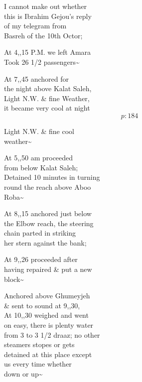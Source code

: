 \documentclass{report}
\begin{document}
	\par{
 	I cannot make out whether\ \\this is Ibrahim Gejou's reply\ \\of my telegram from\ \\Basreh of the 10th Octor;\ \\
	}

	\par{
 	At 4,,15 P.M. we left Amara\ \\Took 26 1/2 passengers\~{}\ \\
	}

	\par{
 	At 7,,45 anchored for\ \\the night above Kalat Saleh,\ \\Light N.W. \& fine Weather,\ \\it became very cool at night\ \\
  \[p: 184 \]

	}

	\par{
 	Light N.W. \& fine cool\ \\weather\~{}\ \\
	}

	\par{
 	At 5,,50 am proceeded\ \\from below Kalat Saleh;\ \\Detained 10 minutes in turning\ \\round the reach above Aboo\ \\Roba\~{}\ \\
	}

	\par{
 	At 8,,15 anchored just below\ \\the Elbow reach, the steering\ \\chain parted in striking\ \\her stern against the bank;\ \\
	}

	\par{
 	At 9,,26 proceeded after\ \\having repaired \& put a new\ \\block\~{}\ \\
	}

	\par{
 	Anchored above Ghumeyjeh\ \\\& sent to sound at 9,,30,\ \\At 10,,30 weighed and went\ \\on easy, there is plenty water\ \\from 3 to 3 1/2 draaz; no other\ \\steamers stopes or gets\ \\detained at this place except\ \\us every time whether\ \\down or up\~{}\ \\
	}
\end{document}

